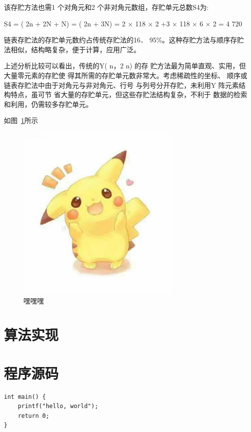 \documentclass{ctexart} %
\begin{document}
该存贮方法也需1 个对角元和2 个非对角元数组，存贮单元总数S4为:

S4 = ( 2n + 2N + N) = ( 2n + 3N) = 2 × 118 × 2 +3 × 118 × 6 × 2 = 4 720

链表存贮法的存贮单元数约占传统存贮法的16． 95\%。这种存贮方法与顺序存贮法相似，结构略复杂，便于计算，应用广泛。

上述分析比较可以看出，传统的Y( n，2 n) 的存
贮方法最为简单直观、实用，但大量零元素的存贮使
得其所需的存贮单元数非常大。考虑稀疏性的坐标、
顺序或链表存贮法中由于对角元与非对角元、行号
与列号分开存贮，未利用Y 阵元素结构特点，虽可节
省大量的存贮单元，但这些存贮法结构复杂，不利于
数据的检索和利用，仍需较多存贮单元。



如图~\ref{1}所示
\begin{figure}[htbp]
\small
\centering
\includegraphics[width=8cm]{1.jpg}
\caption{嘿嘿嘿} 
\label{1}
\end{figure}




\section{算法实现}
\section{程序源码}


\begin{verbatim}
int main() {
    printf("hello, world");
    return 0;
}
\end{verbatim}





\end{document}
